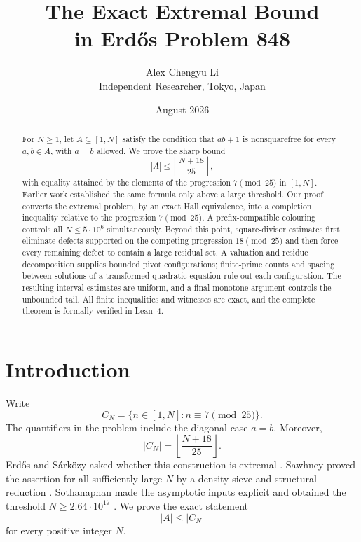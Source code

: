 \documentclass[11pt]{article}
\title{\textbf{The Exact Extremal Bound\\
in Erd\H{o}s Problem 848}}
\author{Alex Chengyu Li\\[3pt]
\small Independent Researcher, Tokyo, Japan}
\date{August 2026}
\theoremstyle{definition}
\newcommand{\CN}{C_N}
\begin{document}
\maketitle

\begin{abstract}
For $N\geq1$, let $A\subseteq[1,N]$ satisfy the condition that $ab+1$ is
nonsquarefree for every $a,b\in A$, with $a=b$ allowed.  We prove the sharp
bound
\[
 |A|\leq \left\lfloor\frac{N+18}{25}\right\rfloor,
\]
with equality attained by the elements of the progression $7\pmod {25}$ in
$[1,N]$.  Earlier work established the same formula only above a large
threshold.  Our proof converts the extremal problem, by an exact Hall
equivalence, into a completion inequality relative to the progression
$7\pmod {25}$.  A prefix-compatible colouring controls all
$N\leq5\cdot10^6$ simultaneously.  Beyond this point, square-divisor
estimates first eliminate defects supported on the competing progression
$18\pmod {25}$ and then force every remaining defect to contain a large
residual set.  A valuation and residue decomposition supplies bounded pivot
configurations; finite-prime counts and spacing between solutions of a
transformed quadratic equation rule out each configuration.  The resulting
interval estimates are uniform, and a final monotone argument controls the
unbounded tail.  All finite inequalities and witnesses are exact, and the
complete theorem is formally verified in Lean~4.
\end{abstract}

\section{Introduction}

Write
\[
  \CN=\{n\in[1,N]:n\equiv7\pmod {25}\}.
\]
The quantifiers in the problem include the diagonal case $a=b$.  Moreover,
\begin{equation}\label{eq:sharp-cardinality}
 |\CN|=\left\lfloor\frac{N+18}{25}\right\rfloor.
\end{equation}
Erd\H{o}s and S\'ark\"ozy asked whether this construction is extremal
\cite{Erdos848Original}.  Sawhney proved the assertion for all sufficiently
large $N$ by a density sieve and structural reduction
\cite{Sawhney848}.  Sothanaphan made the asymptotic inputs explicit and
obtained the threshold $N\geq2.64\cdot10^{17}$
\cite{Sothanaphan848}.  We prove the exact statement
\begin{equation}\label{eq:target}
  |A|\leq|\CN|
\end{equation}
for every positive integer $N$.
\end{document}

